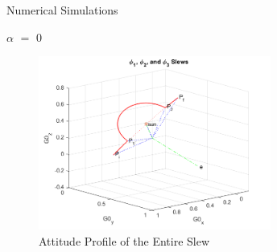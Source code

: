 \documentclass{beamer}
\begin{document}
%		
%		
\begin{frame}{Numerical Simulations}
	\begin{block}{$\alpha$ $=$ 0}
		
		\begin{figure}[H]
			\label{fig:phi1_phi2_phi3_alpha0}
			\includegraphics[width=3in]{figures/alpha0/phi1_phi2_phi3.png}
			\caption{Attitude Profile of the Entire Slew}
		\end{figure}
		
	\end{block}
\end{frame}
\end{document}
